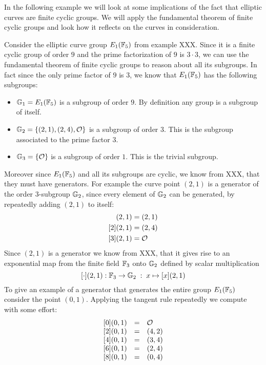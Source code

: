 In the following example we will look at some implications of the fact that elliptic curves are finite cyclic groups. We will apply the fundamental theorem of finite cyclic groups and look how it reflects on the curves in consideration.
\begin{example}Consider the elliptic curve group $E_1(\F_5)$ from example XXX. Since it is a finite cyclic group of order $9$ and the prime factorization of $9$ is $3\cdot 3$, we can use the fundamental theorem of finite cyclic groups to reason about all its subgroups. In fact since the only prime factor of $9$ is $3$, we know that $E_1(\F_5)$ has the following subgroups:
\begin{itemize}
\item $\G_1 = E_1(\F_5)$ is a subgroup of order $9$. By definition any group is a subgroup of itself.
\item $\G_2 = \{(2,1),(2,4),\Oinf\}$ is a subgroup of order $3$. This is the subgroup associated to the prime factor $3$.
\item $\G_3 = \{\Oinf\}$ is a subgroup of order $1$. This is the trivial subgroup.
\end{itemize}
Moreover since $E_1(\F_5)$ and all its subgroups are cyclic, we know from XXX, that they must have generators. For example the curve point $(2,1)$ is a generator of the order $3$-subgroup $\G_2$, since every element of $\G_2$ can be generated, by repeatedly adding $(2,1)$ to itself: 
\begin{align*}
[1](2,1) & = (2,1) \\
[2](2,1) & = (2,4) \\
[3](2,1) & = \Oinf
\end{align*}
Since $(2,1)$ is a generator we know from XXX, that it gives rise to an exponential map from the finite field $\F_3$ onto $\G_2$ defined by scalar multiplication
$$
[\cdot](2,1): \F_3 \to \G_2\; : \; x\mapsto [x](2,1) 
$$
To give an example of a generator that generates the entire group $E_1(\F_5)$ consider the point $(0,1)$. Applying the tangent rule repeatedly we compute with some effort:
$$
\begin{array}{lccr}
{}\begin{array}{lcl}
{}[0](0,1) &=& \Oinf \\
{}[2](0,1) &=& (4, 2) \\ 
{}[4](0,1) &=& (3, 4) \\ 
{}[6](0,1) &=& (2, 4) \\ 
{}[8](0,1) &=& (0, 4) \\ 

\end{array}
\end{array}$$
\end{example}

